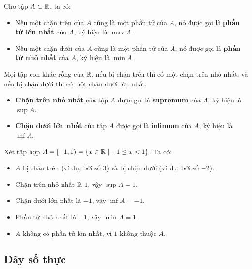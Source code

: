 \begin{definition}
    Cho tập $A \subset \mathbb{R}$, ta có:
    \begin{itemize}
        \item Nếu một chặn trên của $A$ cũng là một phần tử của $A$, nó được gọi là \textbf{phần tử lớn nhất} của $A$, ký hiệu là $\max A$.
        \item Nếu một chặn dưới của $A$ cũng là một phần tử của $A$, nó được gọi là \textbf{phần tử nhỏ nhất} của $A$, ký hiệu là $\min A$.
    \end{itemize}
\end{definition}

\begin{proposition}
    Mọi tập con khác rỗng của $\mathbb{R}$, nếu bị chặn trên thì có một chặn trên nhỏ nhất, và nếu bị chặn dưới thì có một chặn dưới lớn nhất.
\end{proposition}

\begin{itemize}
    \item \textbf{Chặn trên nhỏ nhất} của tập $A$ được gọi là \textbf{supremum} của $A$, ký hiệu là $\sup A$.
    \item \textbf{Chặn dưới lớn nhất} của tập $A$ được gọi là \textbf{infimum} của $A$, ký hiệu là $\inf A$.
\end{itemize}

\begin{example}
    Xét tập hợp $A = [-1, 1) = \{x \in \mathbb{R} \mid -1 \le x < 1\}$. Ta có:
    \begin{itemize}
        \item $A$ bị chặn trên (ví dụ, bởi số $3$) và bị chặn dưới (ví dụ, bởi số $-2$).
        \item Chặn trên nhỏ nhất là $1$, vậy $\sup A = 1$.
        \item Chặn dưới lớn nhất là $-1$, vậy $\inf A = -1$.
        \item Phần tử nhỏ nhất là $-1$, vậy $\min A = 1$.
        \item $A$ không có phần tử lớn nhất, vì $1$ không thuộc $A$.
    \end{itemize}
\end{example}

\subsection{Dãy số thực}
\label{subsec:day_so_thuc}

